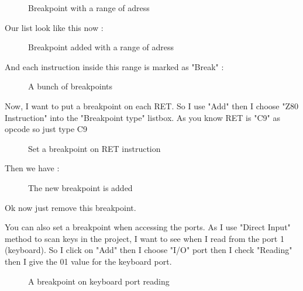 \documentclass[10pt]{report}
\begin{document}
\begin{figure}[H]
\centering
{}
\caption{Breakpoint with a range of adress}
\end{figure}

Our list look like this now :\newline
\begin{figure}[H]
\centering
{}
\caption{Breakpoint added with a range of adress}
\end{figure}

And each instruction inside this range is marked as "Break" :\newline
\begin{figure}[H]
\centering
{}
\caption{A bunch of breakpoints}
\end{figure}

Now, I want to put a breakpoint on each RET.\newline
So I use "Add" then I choose "Z80 Instruction" into the "Breakpoint type" listbox.\newline
As you know RET is "C9" as opcode so just type C9 
\begin{figure}[H]
\centering
{}
\caption{Set a breakpoint on RET instruction}
\end{figure}

Then we have :\newline
\begin{figure}[H]
\centering
{}
\caption{The new breakpoint is added}
\end{figure}
Ok now just remove this breakpoint.\newline

You can also set a breakpoint when accessing the ports.\newline
As I use "Direct Input" method to scan keys in the project, I want to see when I read from the port 1 (keyboard).\newline
So I click on "Add" then I choose "I/O" port then I check "Reading" then I give the 01 value for the keyboard port.\newline
\begin{figure}[H]
\centering
{}
\caption{A breakpoint on keyboard port reading}
\end{figure}
\end{document}
